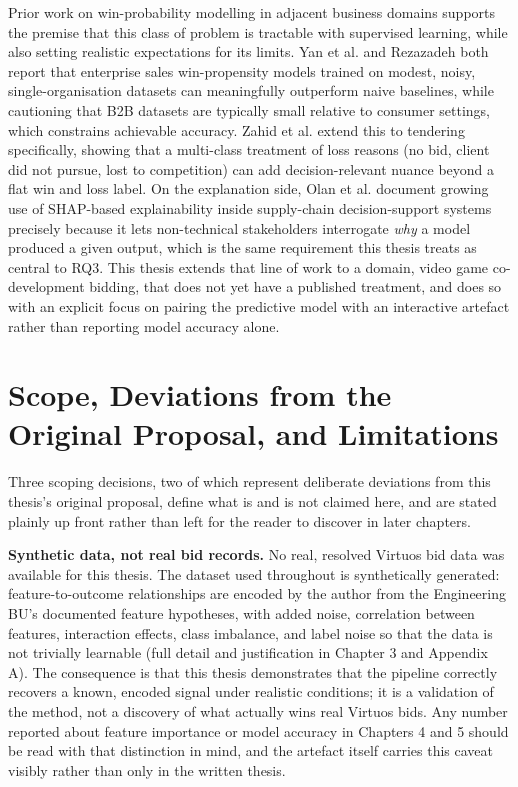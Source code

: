 \documentclass[12pt,oneside]{report}
\begin{document}
Prior work on win-probability modelling in adjacent business domains
supports the premise that this class of problem is tractable with
supervised learning, while also setting realistic expectations for its
limits. Yan et al. \citep{yan2015sales} and Rezazadeh
\citep{rezazadeh2020generalized} both report that enterprise sales
win-propensity models trained on modest, noisy, single-organisation
datasets can meaningfully outperform naive baselines, while cautioning
that B2B datasets are typically small relative to consumer settings,
which constrains achievable accuracy. Zahid et al.
\citep{zahid2021predicting} extend this to tendering specifically,
showing that a multi-class treatment of loss reasons (no bid, client did
not pursue, lost to competition) can add decision-relevant nuance beyond
a flat win and loss label. On the explanation side, Olan et al.
\citep{olan2024enabling} document growing use of SHAP-based
explainability inside supply-chain decision-support systems precisely
because it lets non-technical stakeholders interrogate \emph{why} a
model produced a given output, which is the same requirement this thesis
treats as central to RQ3. This thesis extends that line of work to a
domain, video game co-development bidding, that does not yet have a
published treatment, and does so with an explicit focus on pairing the
predictive model with an interactive artefact rather than reporting
model accuracy alone.

\hypertarget{scope-deviations-from-the-original-proposal-and-limitations}{%
\section{Scope, Deviations from the Original Proposal, and
Limitations}\label{scope-deviations-from-the-original-proposal-and-limitations}}

Three scoping decisions, two of which represent deliberate deviations
from this thesis's original proposal, define what is and is not claimed
here, and are stated plainly up front rather than left for the reader to
discover in later chapters.

\textbf{Synthetic data, not real bid records.} No real, resolved Virtuos
bid data was available for this thesis. The dataset used throughout is
synthetically generated: feature-to-outcome relationships are encoded by
the author from the Engineering BU's documented feature hypotheses, with
added noise, correlation between features, interaction effects, class
imbalance, and label noise so that the data is not trivially learnable
(full detail and justification in Chapter 3 and Appendix A). The
consequence is that this thesis demonstrates that the pipeline correctly
recovers a known, encoded signal under realistic conditions; it is a
validation of the method, not a discovery of what actually wins real
Virtuos bids. Any number reported about feature importance or model
accuracy in Chapters 4 and 5 should be read with that distinction in
mind, and the artefact itself carries this caveat visibly rather than
only in the written thesis.
\end{document}
